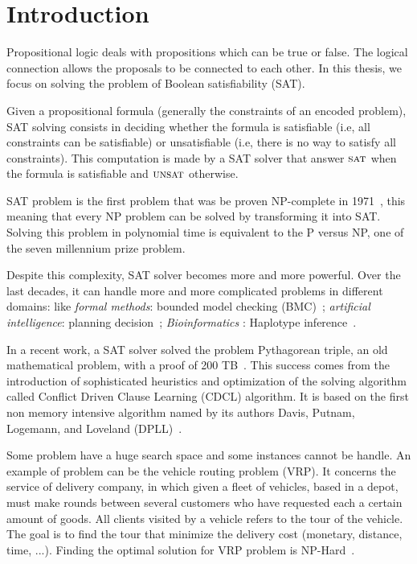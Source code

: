\chapter{Introduction}\label{chap:intro}



Propositional logic deals with propositions which can be true or false.
The logical connection allows the proposals to be connected to each other.
In this thesis, we focus on solving the problem of Boolean satisfiability (SAT).

Given a propositional formula (generally the constraints of an encoded problem),
SAT solving consists in deciding whether the formula is satisfiable (i.e, all constraints can be
satisfiable) or unsatisfiable (i.e, there is no way to satisfy all constraints).
This computation is made by a SAT solver that answer $\textsc{sat}$ when the formula is satisfiable
and $\textsc{unsat}$ otherwise.

SAT problem is the first problem that was be proven NP-complete in 1971~\cite{cook1971complexity}, this 
meaning that every NP problem can be solved by transforming it into SAT. Solving this problem in 
polynomial time is equivalent to the P versus NP, one of the seven millennium prize problem.


Despite this complexity, SAT solver becomes more and more powerful.
Over the last decades, it can handle more and more complicated problems in different domains:
like \emph{formal methods}: bounded model checking (BMC)~\cite{bmc_99}; \emph{artificial intelligence}: planning decision~\cite{planning_92}; \emph{Bioinformatics} : Haplotype inference~\cite{biology_06}.

In a recent work, a SAT solver solved the problem Pythagorean triple, an old mathematical problem,
with a proof of 200 TB~\cite{heule2016solving}.
This success comes from the introduction of sophisticated heuristics and optimization of the solving 
algorithm called Conflict Driven Clause Learning (CDCL) algorithm. It is based on the first non memory
intensive algorithm named by its authors Davis, Putnam, Logemann, and Loveland (DPLL)~\cite{dpll_62}.



Some problem have a huge search space and some instances cannot be handle.
An example of problem can be the vehicle routing problem (VRP).
It concerns the service of delivery company, in which
given a fleet of vehicles, based in a depot, must make rounds between several customers  who have requested
each a certain amount of goods. All clients visited by a vehicle refers to the tour of the vehicle. 
The goal is to find the tour that minimize the delivery cost (monetary, distance, time, ...).
Finding the optimal solution for VRP problem is NP-Hard~\cite{toth2002vehicle}.

